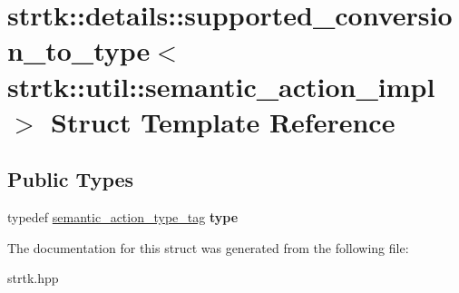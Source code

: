 \hypertarget{structstrtk_1_1details_1_1supported__conversion__to__type_3_01strtk_1_1util_1_1semantic__action__impl_01_4}{\section{strtk\-:\-:details\-:\-:supported\-\_\-conversion\-\_\-to\-\_\-type$<$ strtk\-:\-:util\-:\-:semantic\-\_\-action\-\_\-impl $>$ Struct Template Reference}
\label{structstrtk_1_1details_1_1supported__conversion__to__type_3_01strtk_1_1util_1_1semantic__action__impl_01_4}
}
\subsection*{Public Types}
\begin{DoxyCompactItemize}
\item 
\hypertarget{structstrtk_1_1details_1_1supported__conversion__to__type_3_01strtk_1_1util_1_1semantic__action__impl_01_4_aa208cec9c04720f7e701a94ee4de135f}{typedef \hyperlink{structstrtk_1_1details_1_1semantic__action__type__tag}{semantic\-\_\-action\-\_\-type\-\_\-tag} {\bfseries type}}\label{structstrtk_1_1details_1_1supported__conversion__to__type_3_01strtk_1_1util_1_1semantic__action__impl_01_4_aa208cec9c04720f7e701a94ee4de135f}

\end{DoxyCompactItemize}


The documentation for this struct was generated from the following file\-:\begin{DoxyCompactItemize}
\item 
strtk.\-hpp\end{DoxyCompactItemize}

